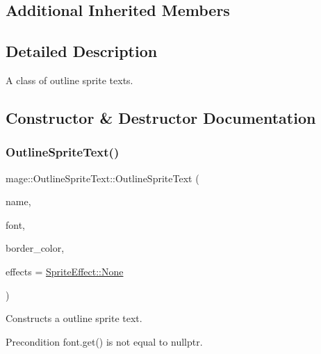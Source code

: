 \subsection*{Additional Inherited Members}


\subsection{Detailed Description}
A class of outline sprite texts. 

\subsection{Constructor \& Destructor Documentation}
\hypertarget{classmage_1_1_outline_sprite_text_a20863727c984b3765c2282d1e50047ea}{}\label{classmage_1_1_outline_sprite_text_a20863727c984b3765c2282d1e50047ea} 
\subsubsection{\texorpdfstring{Outline\+Sprite\+Text()}{OutlineSpriteText()}\hspace{0.1cm}{\footnotesize\ttfamily [1/4]}}
{\footnotesize\ttfamily mage\+::\+Outline\+Sprite\+Text\+::\+Outline\+Sprite\+Text (\begin{DoxyParamCaption}\item[{const string \&}]{name,  }\item[{\hyperlink{namespacemage_a1e01ae66713838a7a67d30e44c67703e}{Shared\+Ptr}$<$ \hyperlink{classmage_1_1_sprite_font}{Sprite\+Font} $>$}]{font,  }\item[{const \hyperlink{structmage_1_1_color}{Color} \&}]{border\+\_\+color,  }\item[{\hyperlink{namespacemage_a9cfe18123066ba4236f548f9de75d881}{Sprite\+Effect}}]{effects = {\ttfamily \hyperlink{namespacemage_a9cfe18123066ba4236f548f9de75d881a6adf97f83acf6453d4a6a4b1070f3754}{Sprite\+Effect\+::\+None}} }\end{DoxyParamCaption})\hspace{0.3cm}{\ttfamily [explicit]}}

Constructs a outline sprite text.

\begin{DoxyPrecond}{Precondition}
{\ttfamily font.\+get()} is not equal to {\ttfamily nullptr}. 
\end{DoxyPrecond}

